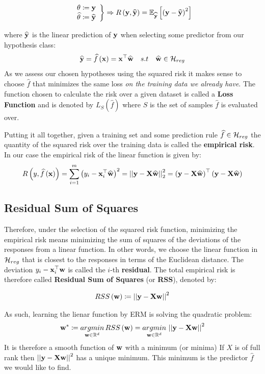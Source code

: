 $$
\left.\begin{array}{c}
\theta \coloneqq \mathbf{y}\\
\widehat{\theta} \coloneqq \widehat{\mathbf{y}}
\end{array}\right\} \Rightarrow R\left(\mathbf{y},\widehat{\mathbf{y}}\right)=\mathbb{E}_{\widehat{\mathbf{y}}}\left[\left(\mathbf{y}-\widehat{\mathbf{y}}\right)^2\right]
$$

where $\widehat{\mathbf{y}}$ is the linear prediction of $\mathbf{y}$ when selecting some predictor from our hypothesis class: 
$$ \widehat{\mathbf{y}}=\widehat{f}\left(\mathbf{x}\right)=\mathbf{x}^\top\widehat{\mathbf{w}}\quad s.t \quad \widehat{\mathbf{w}}\in \mathcal{H}_{reg} $$
As we assess our chosen hypotheses using the squared risk it makes sense to choose $\widehat{f}$ that minimizes the same loss \textit{on the training data we already have}. The function chosen to calculate the risk over a given dataset is called a \textbf{Loss Function} and is denoted by $L_S\left(\widehat{f}\right)$ where $S$ is the set of samples $\widehat{f}$ is evaluated over.

Putting it all together, given a training set \trainset and some prediction rule $\widehat{f}\in\mathcal{H}_{reg}$ the quantity of the squared risk over the training data is called the \textbf{empirical risk}. In our case the empirical risk of the linear function is given by: $$ R\left(y,\widehat{f}\left(\mathbf{x}\right)\right)=\sum^m_{i=1}\left(y_i-\mathbf{x}_i^\top\widehat{\mathbf{w}}\right)^2 = \left|\left| \mathbf{y}-\mathbf{X}\widehat{\mathbf{w}}\right|\right|^2_2=\left(\mathbf{y}-\mathbf{X}\widehat{\mathbf{w}}\right)^\top \left(\mathbf{y}-\mathbf{X}\widehat{\mathbf{w}}\right)$$

\subsection{Residual Sum of Squares}\label{rss}
Therefore, under the selection of the squared risk function, minimizing the empirical risk means minimizing the sum of squares of the deviations of the responses from a linear function. In other words, we choose the linear function in $\mathcal{H}_{reg}$ that is closest to the responses in terms of the Euclidean distance. The deviation $y_i-\mathbf{x}_i^\top\mathbf{w}$ is called the $i$-th \textbf{residual}. The total empirical risk is therefore called \textbf{Residual Sum of Squares} (or \textbf{RSS}), denoted by:

\begin{align}
RSS\left(\mathbf{w}\right) \coloneqq \left|\left| \mathbf{y}-\mathbf{X}\mathbf{w}\right|\right|^2
\label{eqn:rss}
\end{align}

As such, learning the lienar function by ERM is solving the quadratic problem:
\begin{align}
\mathbf{w}^*\coloneqq\underset{\mathbf{w}\in\mathbb{R}^d}{argmin}\,RSS\left(\mathbf{w}\right)=\underset{\mathbf{w}\in\mathbb{R}^d}{argmin}\,\left|\left| \mathbf{y}-\mathbf{X}\mathbf{w}\right|\right|^2
\label{eqn:opt_rss}
\end{align}
It is therefore a smooth function of $\mathbf{w}$ with a minimum (or minima) If $X$ is of full rank then $\left|\left| \mathbf{y}-\mathbf{X}\mathbf{w}\right|\right|^2$ has a unique minimum. This minimum is the predictor $\widehat{f}$ we would like to find.

